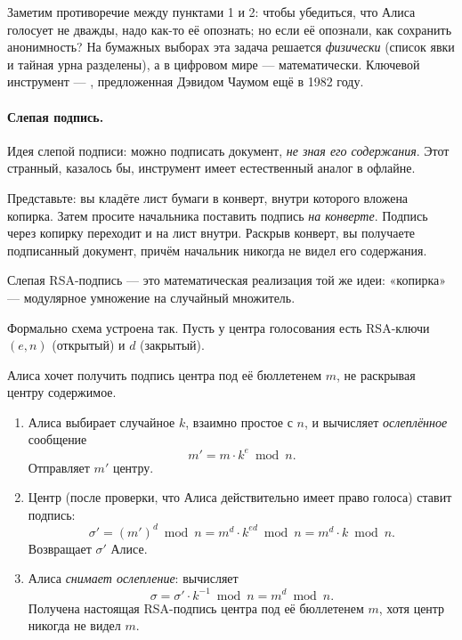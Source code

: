 Заметим противоречие между пунктами 1 и 2: чтобы убедиться, что Алиса голосует не дважды, надо как-то её опознать; но если её опознали, как сохранить анонимность? На бумажных выборах эта задача решается \emph{физически} (список явки и тайная урна разделены), а в цифровом мире --- математически. Ключевой инструмент --- , предложенная Дэвидом Чаумом ещё в 1982 году.

\paragraph*{Слепая подпись.} Идея слепой подписи: можно подписать документ, \emph{не зная его содержания}. Этот странный, казалось бы, инструмент имеет естественный аналог в офлайне.

\begin{interestbox}[title={Это интересно: аналогия с конвертом и копиркой}]
Представьте: вы кладёте лист бумаги в конверт, внутри которого вложена копирка. Затем просите начальника поставить подпись \emph{на конверте}. Подпись через копирку переходит и на лист внутри. Раскрыв конверт, вы получаете подписанный документ, причём начальник никогда не видел его содержания.

Слепая RSA-подпись --- это математическая реализация той же идеи: «копирка» --- модулярное умножение на случайный множитель.
\end{interestbox}

Формально схема устроена так. Пусть у центра голосования есть RSA-ключи $(e, n)$ (открытый) и $d$ (закрытый).

\begin{algorithmbox}[title={Алгоритм: слепая подпись RSA}]
Алиса хочет получить подпись центра под её бюллетенем $m$, не раскрывая центру содержимое.
\begin{enumerate}
  \item Алиса выбирает случайное $k$, взаимно простое с $n$, и вычисляет \emph{ослеплённое} сообщение
  \[
    m' = m \cdot k^{e} \bmod n.
  \]
  Отправляет $m'$ центру.

  \item Центр (после проверки, что Алиса действительно имеет право голоса) ставит подпись:
  \[
    \sigma' = (m')^{d} \bmod n = m^{d} \cdot k^{ed} \bmod n = m^{d} \cdot k \bmod n.
  \]
  Возвращает $\sigma'$ Алисе.

  \item Алиса \emph{снимает ослепление}: вычисляет
  \[
    \sigma = \sigma' \cdot k^{-1} \bmod n = m^{d} \bmod n.
  \]
  Получена настоящая RSA-подпись центра под её бюллетенем $m$, хотя центр никогда не видел $m$.
\end{enumerate}
\end{algorithmbox}


